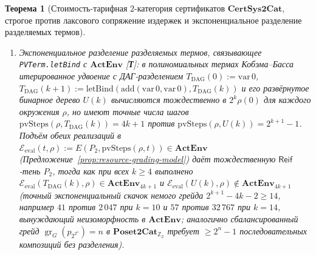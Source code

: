 \documentclass[11pt]{article}
\theoremstyle{plain}
\newtheorem{theorem}{Теорема}[section]
\theoremstyle{definition}
\newcommand{\gr}{\operatorname{gr}}
\begin{document}
\begin{theorem}[Стоимость-тарифная $2$-категория сертификатов $\mathbf{CertSys2Cat}$, строгое против лаксового сопряжение издержек и экспоненциальное разделение разделяемых термов]
\begin{enumerate}[nosep,label=(\roman*)]
\item \emph{Экспоненциальное разделение разделяемых термов, связывающее \texttt{PVTerm.letBind} с $\mathbf{ActEnv}$ \textup{[\textbf{Т}]}}: в полиномиальных термах Кобэма--Басса~\cite{Buss1986} итерированное удвоение с ДАГ-разделением $T_{\mathrm{DAG}}(0) := \mathrm{var}\,0$, $T_{\mathrm{DAG}}(k+1) := \mathrm{letBind}(\mathrm{add}(\mathrm{var}\,0, \mathrm{var}\,0), T_{\mathrm{DAG}}(k))$ и его развёрнутое бинарное дерево $U(k)$ вычисляются тождественно в $2^k \rho(0)$ для каждого окружения $\rho$, но имеют точные числа шагов $\mathrm{pvSteps}(\rho, T_{\mathrm{DAG}}(k)) = 4k + 1$ против $\mathrm{pvSteps}(\rho, U(k)) = 2^{k+1} - 1$. Подъём обеих реализаций в $\mathcal{E}_{\mathrm{eval}}(t, \rho) := E(P_2, \mathrm{pvSteps}(\rho, t)) \in \mathbf{ActEnv}$ (Предложение~\ref{prop:resource-grading-model}) даёт тождественную $\mathsf{Reif}$-тень $P_2$, тогда как при всех $k \ge 4$ выполнено $\mathcal{E}_{\mathrm{eval}}(T_{\mathrm{DAG}}(k), \rho) \in \mathbf{ActEnv}_{4k+1}$ и $\mathcal{E}_{\mathrm{eval}}(U(k), \rho) \notin \mathbf{ActEnv}_{4k+1}$ (точный экспоненциальный скачок немого грейда $2^{k+1} - 4k - 2 \ge 14$, например $41$ против $2\,047$ при $k=10$ и $57$ против $32\,767$ при $k=14$, вынуждающий неизоморфность в $\mathbf{ActEnv}$; аналогично сбалансированный грейд $\gr_G(p_{2^{2^n}}) = n$ в $\mathbf{Poset2Cat}_{\mathbb{Z}_2}$ требует $\ge 2^n - 1$ последовательных композиций без разделения).

\end{enumerate}
\end{theorem}
\end{document}
